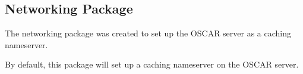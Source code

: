 %
%
%

\subsection{Networking Package}
\label{app:networking-overview}


The networking package was created to set up the OSCAR server as a caching 
nameserver. %

By default, this package will set up a caching nameserver on the OSCAR server.
